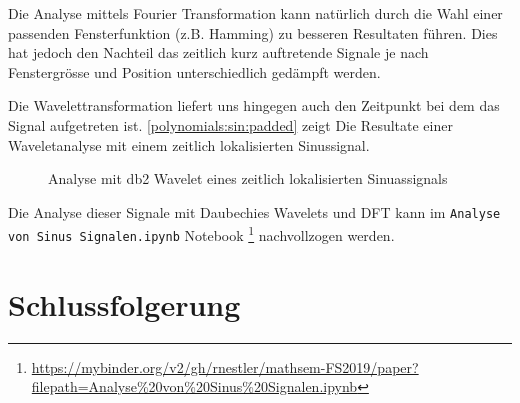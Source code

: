 \begin{refsection}
Die Analyse mittels Fourier Transformation kann natürlich durch die Wahl einer
passenden Fensterfunktion (z.B. Hamming) zu besseren Resultaten führen. Dies
hat jedoch den Nachteil das zeitlich kurz auftretende Signale je nach
Fenstergrösse und Position unterschiedlich gedämpft werden.

Die Wavelettransformation liefert uns hingegen auch den Zeitpunkt bei dem das
Signal aufgetreten ist.  \autoref{polynomials:sin:padded} zeigt Die Resultate
einer Waveletanalyse mit einem zeitlich lokalisierten Sinussignal.

\begin{figure}
    \centering
    
    \caption{Analyse mit db2 Wavelet eines zeitlich lokalisierten Sinuassignals\label{polynomials:sin:padded}}
\end{figure}

Die Analyse dieser Signale mit Daubechies Wavelets und DFT kann im
\texttt{Analyse von Sinus Signalen.ipynb} Notebook%
\footnote{\url{https://mybinder.org/v2/gh/rnestler/mathsem-FS2019/paper?filepath=Analyse\%20von\%20Sinus\%20Signalen.ipynb}}
nachvollzogen werden.

\section{Schlussfolgerung}

\printbibliography[heading=subbibliography]
\end{refsection}
